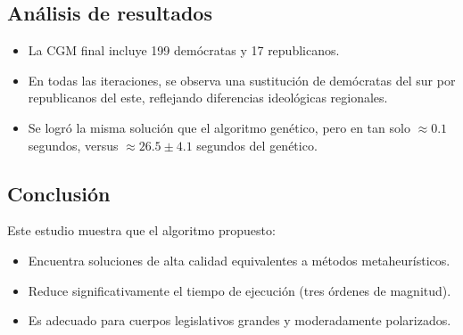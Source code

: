 \documentclass[12pt]{article}
\begin{document}
\subsection*{Análisis de resultados}

\begin{itemize}
    \item La CGM final incluye 199 demócratas y 17 republicanos.
    \item En todas las iteraciones, se observa una sustitución de demócratas del sur por republicanos del este, reflejando diferencias ideológicas regionales.
    \item Se logró la misma solución que el algoritmo genético, pero en tan solo $\approx 0.1$ segundos, versus $\approx 26.5 \pm 4.1$ segundos del genético.
\end{itemize}

\subsection*{Conclusión}

Este estudio muestra que el algoritmo propuesto:
\begin{itemize}
    \item Encuentra soluciones de alta calidad equivalentes a métodos metaheurísticos.
    \item Reduce significativamente el tiempo de ejecución (tres órdenes de magnitud).
    \item Es adecuado para cuerpos legislativos grandes y moderadamente polarizados.
\end{itemize}
\end{document}
